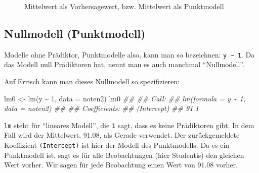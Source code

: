 \documentclass[
  letterpaper,
]{scrbook}
\newenvironment{Shaded}{\begin{snugshade}}{\end{snugshade}}
\newcommand{\AttributeTok}[1]{\textcolor[rgb]{0.40,0.45,0.13}{#1}}
\newcommand{\DecValTok}[1]{\textcolor[rgb]{0.68,0.00,0.00}{#1}}
\newcommand{\DocumentationTok}[1]{\textcolor[rgb]{0.37,0.37,0.37}{\textit{#1}}}
\newcommand{\FunctionTok}[1]{\textcolor[rgb]{0.28,0.35,0.67}{#1}}
\newcommand{\NormalTok}[1]{\textcolor[rgb]{0.00,0.23,0.31}{#1}}
\newcommand{\OtherTok}[1]{\textcolor[rgb]{0.00,0.23,0.31}{#1}}
\newcommand{\SpecialCharTok}[1]{\textcolor[rgb]{0.37,0.37,0.37}{#1}}
\theoremstyle{definition}
\theoremstyle{definition}
\theoremstyle{definition}
\theoremstyle{remark}
\begin{document}
\begin{figure}


\caption{\label{fig-noten3}Mittelwert als Vorhersagewert, bzw.
Mittelwert als Punktmodell}

\end{figure}%

\subsection{Nullmodell (Punktmodell)}\label{nullmodell-punktmodell}

Modelle ohne Prädiktor, Punktmodelle also, kann man so bezeichnen:
\texttt{y\ \textasciitilde{}\ 1}. Da das Modell null Prädiktoren hat,
nennt man es auch manchmal \enquote{Nullmodell}.

Auf Errisch kann man dieses Nullmodell so spezifizieren:

\begin{Shaded}
\begin{Highlighting}[]
\NormalTok{lm0 }\OtherTok{\textless{}{-}} \FunctionTok{lm}\NormalTok{(y }\SpecialCharTok{\textasciitilde{}} \DecValTok{1}\NormalTok{, }\AttributeTok{data =}\NormalTok{ noten2)}
\NormalTok{lm0}
\DocumentationTok{\#\# }
\DocumentationTok{\#\# Call:}
\DocumentationTok{\#\# lm(formula = y \textasciitilde{} 1, data = noten2)}
\DocumentationTok{\#\# }
\DocumentationTok{\#\# Coefficients:}
\DocumentationTok{\#\# (Intercept)  }
\DocumentationTok{\#\#        91.1}
\end{Highlighting}
\end{Shaded}

\texttt{lm} steht für \enquote{lineares Modell}, die \texttt{1} sagt,
dass es keine Prädiktoren gibt. In dem Fall wird der Mittelwert, 91.08,
als Gerade verwendet. Der zurückgemeldete Koeffizient
\texttt{(Intercept)} ist hier der Modell des Punktmodells. Da es ein
Punktmodell ist, sagt es für alle Beobachtungen (hier Studentis) den
gleichen Wert vorher. Wir sagen für jede Beobachtung einen Wert von
91.08 vorher.
\end{document}
